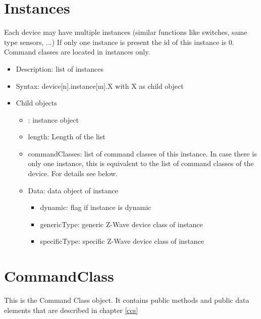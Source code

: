\section{Instances}

Each device may have multiple instances (similar functions like switches, same type 
sensors, ...) If only one instance is present the id of this instance is 0. Command 
classes are located in instances only.

\begin {itemize}
\item Description: list of instances
\item Syntax:  device[n].instance[m].X with  X as child object
\item Child objects
\begin {itemize}
\item [m]: instance object
\item length: Length of the list
\item commandClasses: list of command classes of this instance. In case there is only one instance, this is equivalent to the list of command classes of the device. For details see below.
\item Data: data object of instance 
\begin {itemize}
\item dynamic: flag if instance is dynamic
\item genericType: generic Z-Wave device class of instance
\item specificType: specific Z-Wave device class of instance
\end {itemize}
\end {itemize}
\end {itemize}

\section{CommandClass}

This is the Command Class object. It contains public methods and public data elements that are described
in chapter \ref{ccs}

